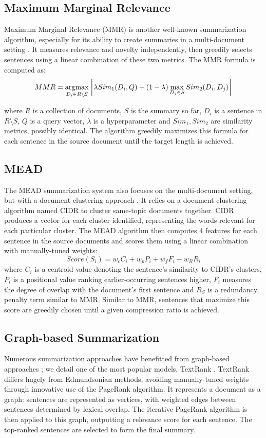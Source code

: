 \subsection{Maximum Marginal Relevance}
Maximum Marginal Relevance (MMR) is another well-known summarization algorithm, especially for its ability to create summaries in a multi-document setting \parencite{mmr}. It measures relevance and novelty independently, then greedily selects sentences using a linear combination of these two metrics. The MMR formula is computed as:
\begin{equation}
    MMR = \operatorname*{\arg\!\max}_{D_i \in R\setminus S} \left[\lambda Sim_1(D_i, Q) - (1 - \lambda)\max_{D_j \in S} Sim_2(D_i, D_j) \right]
\end{equation}

where $R$ is a collection of documents, $S$ is the summary so far, $D_i$ is a sentence in $R\setminus S$, $Q$ is a query vector, $\lambda$ is a hyperparameter and $Sim_1, Sim_2$ are similarity metrics, possibly identical. The algorithm greedily maximizes this formula for each sentence in the source document until the target length is achieved.

\subsection{MEAD}
The MEAD summarization system also focuses on the multi-document setting, but with a document-clustering approach \parencite{mead-radev}. It relies on a document-clustering algorithm named CIDR to cluster same-topic documents together. CIDR produces a vector for each cluster identified, representing the words relevant for each particular cluster. The MEAD algorithm then computes 4 features for each sentence in the source documents and scores them using a linear combination with manually-tuned weights:
\begin{equation}
    Score(S_i) = w_c C_i + w_p P_i + w_f F_i - w_R R_i
\end{equation}
where $C_i$ is a centroid value denoting the sentence's similarity to CIDR's clusters, $P_i$ is a positional value ranking earlier-occurring sentences higher, $F_i$ measures the degree of overlap with the document's first sentence and $R_S$ is a redundancy penalty term similar to MMR. Similar to MMR, sentences that maximize this score are greedily chosen until a given compression ratio is achieved.

\subsection{Graph-based Summarization}
Numerous summarization approaches have benefitted from graph-based approaches \parencite{textrank, lexrank}; we detail one of the most popular models, TextRank \parencite{textrank}. TextRank differs hugely from Edmundsonian methods, avoiding manually-tuned weights through innovative use of the PageRank algorithm. It represents a document as a graph: sentences are represented as vertices, with weighted edges between sentences determined by lexical overlap. The iterative PageRank algorithm is then applied to this graph, outputting a relevance score for each sentence. The top-ranked sentences are selected to form the final summary.

